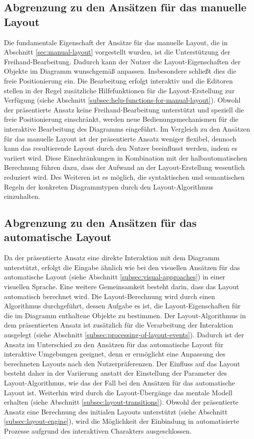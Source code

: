 \subsection{Abgrenzung zu den Ansätzen für das manuelle Layout}
\label{subsec:comparison-manual-layout}

Die fundamentale Eigenschaft der Ansätze für das manuelle Layout, die in Abschnitt \ref{sec:manual-layout} vorgestellt wurden, ist die Unterstützung der Freihand-Bearbeitung. Dadurch kann der Nutzer die Layout-Eigenschaften der Objekte im Diagramm wunschgemäß anpassen. Insbesondere schließt dies die freie Positionierung ein. Die Bearbeitung erfolgt interaktiv und die Editoren stellen in der Regel zusätzliche Hilfefunktionen für die Layout-Erstellung zur Verfügung (siehe Abschnitt \ref{subsec:help-functions-for-manual-layout}). Obwohl der präsentierte Ansatz keine Freihand-Bearbeitung unterstützt und speziell die freie Positionierung einschränkt, werden neue Bedienungsmechanismen für die interaktive Bearbeitung des Diagramms eingeführt. Im Vergleich zu den Ansätzen für das manuelle Layout ist der präsentierte Ansatz weniger flexibel, dennoch kann das resultierende Layout durch den Nutzer beeinflusst werden, indem es variiert wird. Diese Einschränkungen in Kombination mit der halbautomatischen Berechnung führen dazu, dass der Aufwand an der Layout-Erstellung wesentlich reduziert wird. Des Weiteren ist es möglich, die syntaktischen und semantischen Regeln der konkreten Diagrammtypen durch den Layout-Algorithmus einzuhalten.

\subsection{Abgrenzung zu den Ansätzen für das automatische Layout}
\label{subsec:comparison-automatic-layout}

Da der präsentierte Ansatz eine direkte Interaktion mit dem Diagramm unterstützt, erfolgt die Eingabe ähnlich wie bei den visuellen Ansätzen für das automatische Layout (siehe Abschnitt \ref{subsec:visual-approaches}) in einer visuellen Sprache. Eine weitere Gemeinsamkeit besteht darin, dass das Layout automatisch berechnet wird. Die Layout-Berechnung wird durch einen Algorithmus durchgeführt, dessen Aufgabe es ist, die Layout-Eigenschaften für die im Diagramm enthaltene Objekte zu bestimmen. Der Layout-Algorithmus in dem präsentierten Ansatz ist zusätzlich für die Verarbeitung der Interaktion ausgelegt (siehe Abschnitt \ref{subsec:processing-of-layout-events}). Dadurch ist der Ansatz im Unterschied zu den Ansätzen für das automatische Layout für interaktive Umgebungen geeignet, denn er ermöglicht eine Anpassung des berechneten Layouts nach den Nutzerpräferenzen. Der Einfluss auf das Layout besteht daher in der Variierung anstatt der Einstellung der Parameter des Layout-Algorithmus, wie das der Fall bei den Ansätzen für das automatische Layout ist. Weiterhin wird durch die Layout-Übergänge das mentale Modell erhalten (siehe Abschnitt \ref{subsec:layout-transitions}). Obwohl der präsentierte Ansatz eine Berechnung des initialen Layouts unterstützt (siehe Abschnitt \ref{subsec:layout-engine}), wird die Möglichkeit der Einbindung in automatisierte Prozesse aufgrund des interaktiven Charakters ausgeschlossen.

